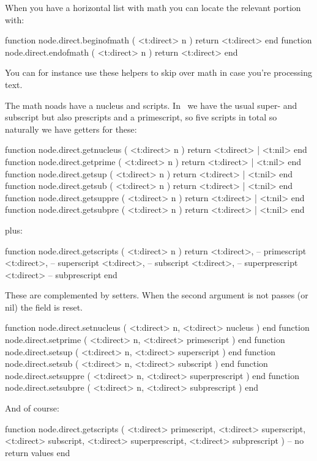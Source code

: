 When you have a horizontal list with math you can locate the relevant portion
with:

\starttyping[option=LUA]
function node.direct.beginofmath ( <t:direct> n ) return <t:direct> end
function node.direct.endofmath   ( <t:direct> n ) return <t:direct> end
\stoptyping

You can for instance use these helpers to skip over math in case you're
processing text.

The math noads have a nucleus and scripts. In \LUAMETATEX\ we have the usual
super- and subscript but also prescripts and a primescript, so five scripts in
total so naturally we have getters for these:

\starttyping[option=LUA]
function node.direct.getnucleus ( <t:direct> n ) return <t:direct> | <t:nil> end
function node.direct.getprime   ( <t:direct> n ) return <t:direct> | <t:nil> end
function node.direct.getsup     ( <t:direct> n ) return <t:direct> | <t:nil> end
function node.direct.getsub     ( <t:direct> n ) return <t:direct> | <t:nil> end
function node.direct.getsuppre  ( <t:direct> n ) return <t:direct> | <t:nil> end
function node.direct.getsubpre  ( <t:direct> n ) return <t:direct> | <t:nil> end
\stoptyping

plus:

\starttyping[option=LUA]
function node.direct.getscripts ( <t:direct> n )
    return
        <t:direct>, -- primescript
        <t:direct>, -- superscript
        <t:direct>, -- subscript
        <t:direct>, -- superprescript
        <t:direct>  -- subprescript
end
\stoptyping

These are complemented by setters. When the second argument is not passes (or nil)
the field is reset.

\starttyping[option=LUA]
function node.direct.setnucleus ( <t:direct> n, <t:direct> nucleus        ) end
function node.direct.setprime   ( <t:direct> n, <t:direct> primescript    ) end
function node.direct.setsup     ( <t:direct> n, <t:direct> superscript    ) end
function node.direct.setsub     ( <t:direct> n, <t:direct> subscript      ) end
function node.direct.setsuppre  ( <t:direct> n, <t:direct> superprescript ) end
function node.direct.setsubpre  ( <t:direct> n, <t:direct> subprescript   ) end
\stoptyping

And of course:

\starttyping[option=LUA]
function node.direct.getscripts (
    <t:direct> primescript,
    <t:direct> superscript,
    <t:direct> subscript,
    <t:direct> superprescript,
    <t:direct> subprescript
)
    -- no return values
end
\stoptyping

